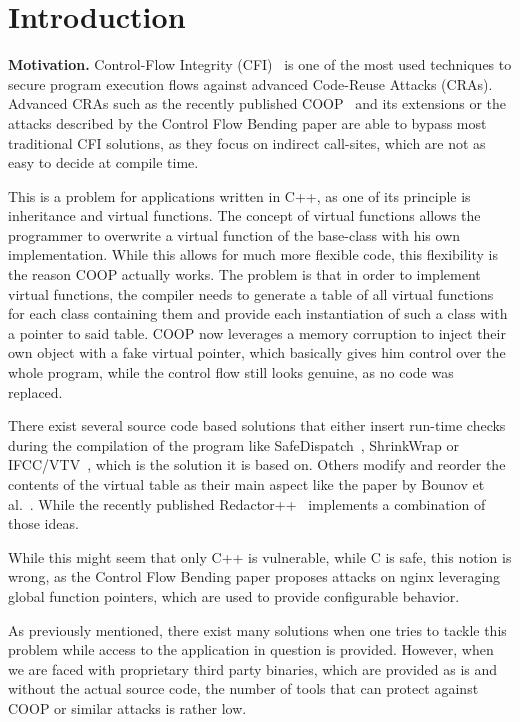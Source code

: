\section{Introduction}
\label{chapter:Introduction}

\textbf{Motivation.}
\label{Motivation}
Control-Flow Integrity (CFI)~\cite{abadi:cfi2, abadi:cfi} is one of the most used techniques to secure program execution 
flows against advanced Code-Reuse Attacks (CRAs).
Advanced CRAs such as the recently published COOP~\cite{schuster:coop} and its extensions \cite{crane:readactor++} 
or the attacks described by the Control Flow Bending paper \cite{carlini:bending} are able to bypass most traditional
CFI solutions, as they focus on indirect call-sites, which are not as easy to decide at compile time.

This is a problem for applications written in C++, as one of its principle is inheritance and virtual functions. 
The concept of virtual functions allows the programmer to overwrite a virtual function of the base-class with his
own implementation. While this allows for much more flexible code, this flexibility is the reason COOP actually 
works. The problem is that in order to implement virtual functions, the compiler needs to generate a table of all
virtual functions for each class containing them and provide each instantiation of such a class with a pointer
to said table. COOP now leverages a memory corruption to inject their own object with a fake virtual pointer, 
which basically gives him control over the whole program, while the control flow still looks genuine, as no 
code was replaced. 

There exist several source code based solutions that either insert run-time checks during the compilation of 
the program like SafeDispatch~\cite{safedispatch:jang}, ShrinkWrap \cite{haller:shrinkwrap} or IFCC/VTV~\cite{vtv:tice}, 
which is the solution it is based on. Others modify and reorder the contents of the virtual table as their main 
aspect like the paper by Bounov et al.~\cite{bounov:interleaving}. While the recently published Redactor++~\cite{crane:readactor++}
implements a combination of those ideas.

While this might seem that only C++ is vulnerable, while C is safe, this notion is wrong, as the 
Control Flow Bending paper \cite{carlini:bending} proposes attacks on nginx leveraging global 
function pointers, which are used to provide configurable behavior.

As previously mentioned, there exist many solutions when one tries to tackle this problem while access
to the application in question is provided. However, when we are faced with proprietary third party 
binaries, which are provided as is and without the actual source code, the number of tools that can
protect against COOP or similar attacks is rather low.

